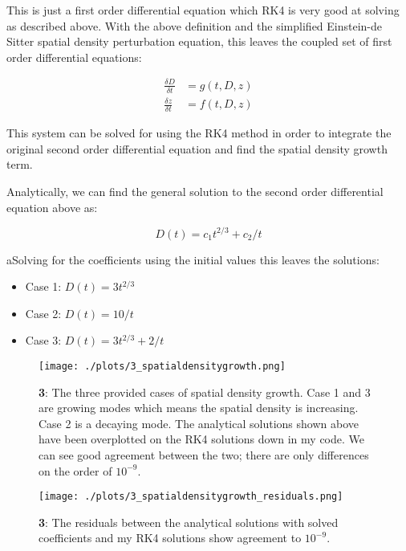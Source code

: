 This is just a first order differential equation which RK4 is very good at solving as described above. With the above definition and the simplified Einstein-de Sitter spatial density perturbation equation, this leaves the coupled set of first order differential equations:

\begin{align*}
  \frac{\delta D}{\delta t} &= g(t,D,z)\\
  \frac{\delta z}{\delta t} &= f(t,D,z)
\end{align*}


This system can be solved for using the RK4 method in order to integrate the original second order differential equation and find the spatial density growth term.

Analytically, we can find the general solution to the second order differential equation above as:

\begin{equation}
  D(t) = c_1t^{2/3}+c_2/t
\end{equation}

aSolving for the coefficients using the initial values this leaves the solutions:

\begin{itemize}
  \item Case 1: $D(t) = 3t^{2/3}$ 
  \item Case 2: $D(t) =10/t$
  \item Case 3: $D(t) =  3t^{2/3}+ 2/t$
  \end{itemize}



\begin{figure}[h!]
  \centering
  \texttt{[image: ./plots/3\_spatialdensitygrowth.png]}
  \caption{\textbf{3}: The three provided cases of spatial density growth. Case 1 and 3 are growing modes which means the spatial density is increasing. Case 2 is a decaying mode. The analytical solutions shown above have been overplotted on the RK4 solutions down in my code. We can see good agreement between the two; there are only differences on the order of $10^{-9}$.}
  \label{fig:spatialdensitygrowth}
\end{figure}


\begin{figure}[h!]
  \centering
  \texttt{[image: ./plots/3\_spatialdensitygrowth\_residuals.png]}
  \caption{\textbf{3}: The residuals between the analytical solutions with solved coefficients and my RK4 solutions show agreement to $10^{-9}$.}
  \label{fig:spatialdensitygrowthresiduals}
\end{figure}

